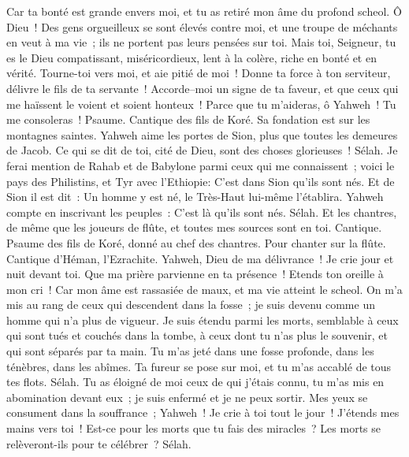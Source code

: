 \begin{multicols}{2}
Car ta bonté est grande envers moi, et tu as retiré mon âme du profond scheol.
Ô Dieu~! Des gens orgueilleux se sont élevés contre moi, et une troupe de méchants en veut à ma vie~; ils ne portent pas leurs pensées sur toi.
Mais toi, Seigneur, tu es le Dieu compatissant, miséricordieux, lent à la colère, riche en bonté et en vérité.
Tourne-toi vers moi, et aie pitié de moi~! Donne ta force à ton serviteur, délivre le fils de ta servante~!
Accorde–moi un signe de ta faveur, et que ceux qui me haïssent le voient et soient honteux~! Parce que tu m'aideras, ô Yahweh~! Tu me consoleras~!
\VerseOne{}Psaume. Cantique des fils de Koré. Sa fondation est sur les montagnes saintes.
Yahweh aime les portes de Sion, plus que toutes les demeures de Jacob.
Ce qui se dit de toi, cité de Dieu, sont des choses glorieuses~! Sélah.
Je ferai mention de Rahab et de Babylone parmi ceux qui me connaissent~; voici le pays des Philistins, et Tyr avec l'Ethiopie: C'est dans Sion qu'ils sont nés.
Et de Sion il est dit~: Un homme y est né, le Très-Haut lui-même l'établira.
Yahweh compte en inscrivant les peuples~: C'est là qu'ils sont nés. Sélah.
Et les chantres, de même que les joueurs de flûte, et toutes mes sources sont en toi.
\VerseOne{}Cantique. Psaume des fils de Koré, donné au chef des chantres. Pour chanter sur la flûte. Cantique d'Héman, l'Ezrachite.
Yahweh, Dieu de ma délivrance~! Je crie jour et nuit devant toi.
Que ma prière parvienne en ta présence~! Etends ton oreille à mon cri~!
Car mon âme est rassasiée de maux, et ma vie atteint le scheol.
On m'a mis au rang de ceux qui descendent dans la fosse~; je suis devenu comme un homme qui n'a plus de vigueur.
Je suis étendu parmi les morts, semblable à ceux qui sont tués et couchés dans la tombe, à ceux dont tu n'as plus le souvenir, et qui sont séparés par ta main.
Tu m'as jeté dans une fosse profonde, dans les ténèbres, dans les abîmes.
Ta fureur se pose sur moi, et tu m'as accablé de tous tes flots. Sélah.
Tu as éloigné de moi ceux de qui j'étais connu, tu m'as mis en abomination devant eux~; je suis enfermé et je ne peux sortir.
Mes yeux se consument dans la souffrance~; Yahweh~! Je crie à toi tout le jour~! J'étends mes mains vers toi~!
Est-ce pour les morts que tu fais des miracles~? Les morts se relèveront-ils pour te célébrer~? Sélah.

\end{multicols}
